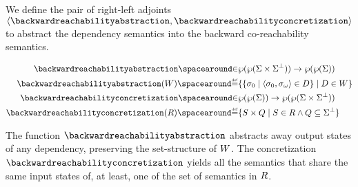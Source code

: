 We define the pair of right-left adjoints $\tuple{\backwardreachabilityabstraction}{\backwardreachabilityconcretization}$ to abstract the dependency semantics into the backward co-reachability semantics.
\begin{definition}
\begin{align*}
  \backwardreachabilityabstraction \IN& \dependencytype \to \backwardreachabilitytype \\
  \backwardreachabilityabstraction(\defsetofsetofdependencies) \DefeQ& \setdef{
    \setdef{\retrieveinput{\defseq}}{\inputoutputtuple{\defseq}\in\defsetofdependencies}
  }{
    \defsetofdependencies\in\defsetofsetofdependencies
  }\\
  \backwardreachabilityconcretization \IN& \backwardreachabilitytype \to \dependencytype \\
  \backwardreachabilityconcretization(\defsetofsetofstates) \DefeQ& \setdef{
    \pair\defsetofstates{Q}
  }{
    \defsetofstates \in \defsetofsetofstates
    \land Q \subseteq \stateandbottom
  }
\end{align*}
\end{definition}
The function $\backwardreachabilityabstraction$ abstracts away output states of any dependency, preserving the set-structure of $W$.
The concretization $\backwardreachabilityconcretization$ yields all the semantics that share the same input states of, at least, one of the set of semantics in $R$.


